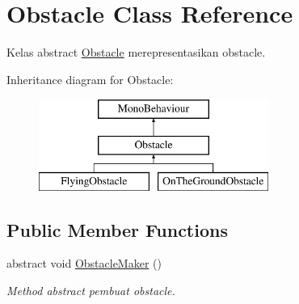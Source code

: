 \hypertarget{class_obstacle}{}\section{Obstacle Class Reference}
\label{class_obstacle}


Kelas abstract \hyperlink{class_obstacle}{Obstacle} merepresentasikan obstacle.  


Inheritance diagram for Obstacle\+:\begin{figure}[H]
\begin{center}
\leavevmode
\includegraphics[height=3.000000cm]{class_obstacle}
\end{center}
\end{figure}
\subsection*{Public Member Functions}
\begin{DoxyCompactItemize}
\item 
abstract void \hyperlink{class_obstacle_a19f2f5d2c3176ee9ea8840862c55aa42}{Obstacle\+Maker} ()
\begin{DoxyCompactList}\small\item\em Method abstract pembuat obstacle. \end{DoxyCompactList}\end{DoxyCompactItemize}
